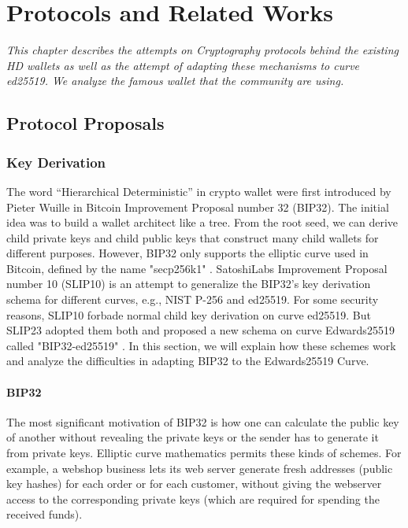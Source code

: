 \chapter{Protocols and Related Works}
\label{chap: Related works}

\textit{This chapter describes the attempts on Cryptography protocols behind the existing HD wallets as
    well as the attempt of adapting these mechanisms to curve ed25519. We analyze the famous wallet that the community are using.}

\minitoc

\section{Protocol Proposals}
\subsection{Key Derivation}

The word “Hierarchical Deterministic” in crypto wallet were first introduced by Pieter Wuille in Bitcoin Improvement Proposal number 32 (BIP32)\cite{github/bip0032}. The initial idea was to build a wallet architect like a tree. From the root seed, we can derive child private keys and child public keys that construct many child wallets for different purposes. However, BIP32 only supports the elliptic curve used in Bitcoin, defined by the name "secp256k1" \cite{secp256k1}. SatoshiLabs Improvement Proposal number 10 (SLIP10) is an attempt to generalize the BIP32's key derivation schema for different curves, e.g., NIST P-256 and ed25519. For some security reasons, SLIP10 forbade normal child key derivation on curve ed25519. But SLIP23 adopted them both and proposed a new schema on curve Edwards25519 called "BIP32-ed25519" \cite{Khovratovich2017}. In this section, we will explain how these schemes work and analyze the difficulties in adapting BIP32 to the Edwards25519 Curve.

\subsubsection{BIP32}
\label{bip32}
The most significant motivation of BIP32 is how one can calculate the public key of another without revealing the private keys or the sender has to generate it from private keys. Elliptic curve mathematics permits these kinds of schemes. For example, a webshop business lets its web server generate fresh addresses (public key hashes) for each order or for each customer, without giving the webserver access to the corresponding private keys (which are required for spending the received funds).

